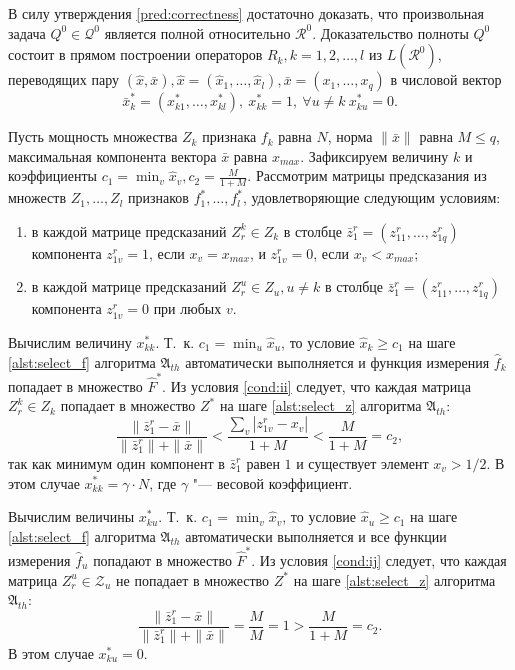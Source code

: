 \begin{Proof}
	В силу утверждения \ref{pred:correctness} достаточно доказать, что произвольная задача $Q^0\in\mathcal Q^0$ является полной относительно $\mathcal R^0$. Доказательство полноты $Q^0$ состоит в прямом построении операторов $R_k, k=1,2,\dots,l$ из $L(\mathcal R^0)$, переводящих пару $(\hat{x},\bar{x}), \hat{x}=(\hat{x}_1,\dots,\hat{x}_l), \bar{x}=(x_1,\dots,x_q)$ в числовой вектор
	\begin{equation} \label{crit:fillness}
		\bar{x}_k^*=(x_{k1}^*,\dots,x_{kl}^*),\ x_{kk}^*=1,\ \forall u\neq k\ x_{ku}^*=0.
	\end{equation} 
	
	Пусть мощность множества $Z_k$ признака $f_k$ равна $N$, норма $\|\bar x\|$ равна $M{\leqslant}q$, максимальная компонента вектора $\bar{x}$ равна $x_{max}$. Зафиксируем величину $k$ и коэффициенты $c_1=\min_v\hat x_v, c_2=\frac{M}{1+M}$. Рассмотрим матрицы предсказания из множеств $Z_1,\dots,Z_l$ признаков $f_1^*,\dots,f_l^*$, удовлетворяющие следующим условиям:
	
 \begin{enumerate}
	 	\item в каждой матрице предсказаний $Z_r^k\in Z_k$ в столбце $\bar{z}_1^r=(z_{11}^r,\dots,z_{1q}^r)$ компонента $z_{1v}^r=1$, если $x_v=x_{max}$, и $z_{1v}^r=0$, если $x_v<x_{max}$; \label{cond:ii}
	 	
	 	\item в каждой матрице предсказаний $Z_r^u\in Z_u, u\neq k$ в столбце $\bar{z}_1^r=(z_{11}^r,\dots,z_{1q}^r)$ компонента $z_{1v}^r=0$ при любых $v$. \label{cond:ij}
 \end{enumerate}
 
 Вычислим величину $x_{kk}^*$. Т.~к. $c_1=\min_u\hat x_u$, то условие $\hat x_k\geqslant c_1$ на шаге \ref{alst:select_f} алгоритма $\mathfrak A_{th}$ автоматически выполняется и функция измерения $\hat f_k$ попадает в множество $\hat F^*$. Из условия \ref{cond:ii} следует, что каждая матрица $Z_r^k\in Z_k$ попадает в множество $Z^*$ на шаге \ref{alst:select_z} алгоритма $\mathfrak A_{th}$:
 \begin{equation}
 	\frac{\|\bar{z}_1^r-\bar{x}\|}{\|\bar{z}_1^r\|+\|\bar{x}\|}<\frac{\sum_v|z_{1v}^r-x_v|}{1+M}<\frac{M}{1+M}=c_2,
 \end{equation}
 так как минимум один компонент в $\bar{z}_1^r$ равен $1$ и существует элемент $x_v>1/2$. В этом случае $x_{kk}^*=\gamma{\cdot}N$, где $\gamma$ "--- весовой коэффициент.
 
 Вычислим величины $x_{ku}^*$. Т.~к. $c_1=\min_v\hat x_v$, то условие $\hat x_u\geqslant c_1$ на шаге \ref{alst:select_f} алгоритма $\mathfrak{A}_{th}$ автоматически выполняется и все функции измерения $\hat f_u$ попадают в множество $\hat F^*$. Из условия \ref{cond:ij} следует, что каждая матрица $Z_r^u\in\mathcal Z_u$ не попадает в множество $Z^*$ на шаге \ref{alst:select_z} алгоритма $\mathfrak A_{th}$:
 \begin{equation}
 	\frac{\|\bar{z}_1^r-\bar{x}\|}{\|\bar{z}_1^r\|+\|\bar{x}\|}=\frac{M}{M}=1>\frac{M}{1+M}=c_2.
 \end{equation}
 В этом случае $x_{ku}^*=0$.
 

\end{Proof}
